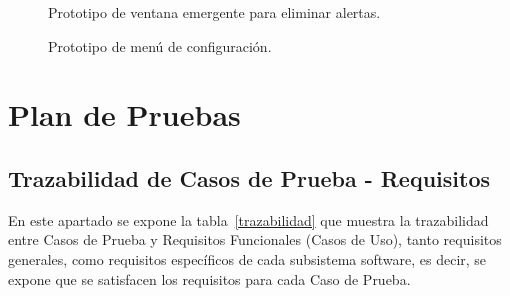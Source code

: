     \begin{figure}[!ht]
      \centering
      {%
        \setlength{\fboxsep}{0pt}%
        \setlength{\fboxrule}{1pt}%
      }%
      \caption{Prototipo de ventana emergente para eliminar alertas.}
      \label{disenoapp_3}
    \end{figure}

    \clearpage
    \begin{figure}[!ht]
      \centering
      {%
        \setlength{\fboxsep}{0pt}%
        \setlength{\fboxrule}{1pt}%
      }%
      \caption{Prototipo de menú de configuración.}
      \label{disenoapp_4}
    \end{figure}
    
\clearpage
\chapter{Plan de Pruebas}
\label{pruebas}
    
    \section{Trazabilidad de Casos de Prueba - Requisitos}
    
    En este apartado se expone la tabla~\ref{trazabilidad} que muestra la trazabilidad entre Casos de Prueba y Requisitos Funcionales (Casos de Uso), tanto requisitos generales, como requisitos específicos de cada subsistema software, es decir, se expone que se satisfacen los requisitos para cada Caso de Prueba.
        
